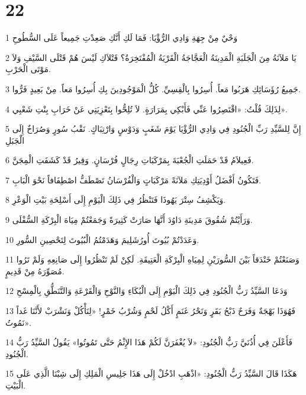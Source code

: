 \chapter{22}

\par 1 وَحْيٌ مِنْ جِهَةِ وَادِي الرُّؤْيَا: فَمَا لَكِ أَنَّكِ صَعِدْتِ جَمِيعاً عَلَى السُّطُوحِ
\par 2 يَا مَلآنَةُ مِنَ الْجَلَبَةِ الْمَدِينَةُ الْعَجَّاجَةُ الْقَرْيَةُ الْمُفْتَخِرَةُ؟ قَتْلاَكِ لَيْسَ هُمْ قَتْلَى السَّيْفِ وَلاَ مَوْتَى الْحَرْبِ.
\par 3 جَمِيعُ رُؤَسَائِكِ هَرَبُوا مَعاً. أُسِرُوا بِالْقِسِيِّ. كُلُّ الْمَوْجُودِينَ بِكِ أُسِرُوا مَعاً. مِنْ بَعِيدٍ فَرُّوا.
\par 4 لِذَلِكَ قُلْتُ: «اقْتَصِرُوا عَنِّي فَأَبْكِي بِمَرَارَةٍ. لاَ تُلِحُّوا بِتَعْزِيَتِي عَنْ خَرَابِ بِنْتِ شَعْبِي».
\par 5 إِنَّ لِلسَّيِّدِ رَبِّ الْجُنُودِ فِي وَادِي الرُّؤْيَا يَوْمَ شَغَبٍ وَدَوْسٍ وَارْتِبَاكٍ. نَقْبُ سُورٍ وَصُرَاخٌ إِلَى الْجَبَلِ
\par 6 فَعِيلاَمُ قَدْ حَمَلَتِ الْجُعْبَةَ بِمَرْكَبَاتِ رِجَالٍ فُرْسَانٍ. وَقِيرُ قَدْ كَشَفَتِ الْمِجَنَّ.
\par 7 فَتَكُونُ أَفْضَلُ أَوْدِيَتِكِ مَلآنَةً مَرْكَبَاتٍ وَالْفُرْسَانُ تَصْطَفُّ اصْطِفَافاً نَحْوَ الْبَابِ.
\par 8 وَيَكْشِفُ سِتْرَ يَهُوذَا فَتَنْظُرُ فِي ذَلِكَ الْيَوْمِ إِلَى أَسْلِحَةِ بَيْتِ الْوَعْرِ.
\par 9 وَرَأَيْتُمْ شُقُوقَ مَدِينَةِ دَاوُدَ أَنَّهَا صَارَتْ كَثِيرَةً وَجَمَعْتُمْ مِيَاهَ الْبِرْكَةِ السُّفْلَى.
\par 10 وَعَدَدْتُمْ بُيُوتَ أُورُشَلِيمَ وَهَدَمْتُمُ الْبُيُوتَ لِتَحْصِينِ السُّورِ.
\par 11 وَصَنَعْتُمْ خَنْدَقاً بَيْنَ السُّورَيْنِ لِمِيَاهِ الْبِرْكَةِ الْعَتِيقَةِ. لَكِنْ لَمْ تَنْظُرُوا إِلَى صَانِعِهِ وَلَمْ تَرُوا مُصَوِّرَهُ مِنْ قَدِيمٍ.
\par 12 وَدَعَا السَّيِّدُ رَبُّ الْجُنُودِ فِي ذَلِكَ الْيَوْمِ إِلَى الْبُكَاءِ وَالنَّوْحِ وَالْقَرْعَةِ وَالتَّنَطُّقِ بِالْمِسْحِ
\par 13 فَهُوَذَا بَهْجَةٌ وَفَرَحٌ ذَبْحُ بَقَرٍ وَنَحْرُ غَنَمٍ أَكْلُ لَحْمٍ وَشُرْبُ خَمْرٍ! «لِنَأْكُلْ وَنَشْرَبْ لأَنَّنَا غَداً نَمُوتُ».
\par 14 فَأَعْلَنَ فِي أُذُنَيَّ رَبُّ الْجُنُودِ: «لاَ يُغْفَرَنَّ لَكُمْ هَذَا الإِثْمُ حَتَّى تَمُوتُوا» يَقُولُ السَّيِّدُ رَبُّ الْجُنُودِ.
\par 15 هَكَذَا قَالَ السَّيِّدُ رَبُّ الْجُنُودِ: «اذْهَبِ ادْخُلْ إِلَى هَذَا جَلِيسِ الْمَلِكِ إِلَى شِبْنَا الَّذِي عَلَى الْبَيْتِ.

